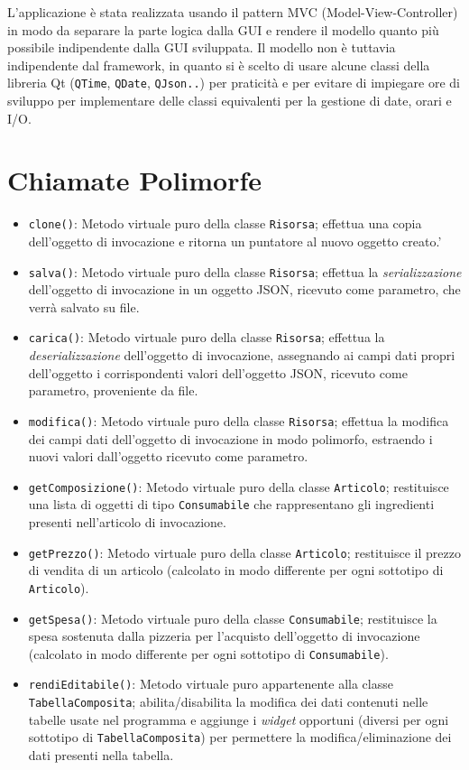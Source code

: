 \documentclass[
  10pt,
]{article}
\begin{document}
L'applicazione è stata realizzata usando il pattern MVC
(Model-View-Controller) in modo da separare la parte logica dalla GUI e
rendere il modello quanto più possibile indipendente dalla GUI
sviluppata. Il modello non è tuttavia indipendente dal framework, in
quanto si è scelto di usare alcune classi della libreria Qt
(\texttt{QTime}, \texttt{QDate}, \texttt{QJson..}) per praticità e per
evitare di impiegare ore di sviluppo per implementare delle classi
equivalenti per la gestione di date, orari e I/O.

\hypertarget{chiamate-polimorfe}{%
\section{Chiamate Polimorfe}\label{chiamate-polimorfe}}

\begin{itemize}
\item
  \texttt{clone()}: Metodo virtuale puro della classe \texttt{Risorsa};
  effettua una copia dell'oggetto di invocazione e ritorna un puntatore
  al nuovo oggetto creato.'
\item
  \texttt{salva()}: Metodo virtuale puro della classe \texttt{Risorsa};
  effettua la \emph{serializzazione} dell'oggetto di invocazione in un
  oggetto JSON, ricevuto come parametro, che verrà salvato su file.
\item
  \texttt{carica()}: Metodo virtuale puro della classe \texttt{Risorsa};
  effettua la \emph{deserializzazione} dell'oggetto di invocazione,
  assegnando ai campi dati propri dell'oggetto i corrispondenti valori
  dell'oggetto JSON, ricevuto come parametro, proveniente da file.
\item
  \texttt{modifica()}: Metodo virtuale puro della classe
  \texttt{Risorsa}; effettua la modifica dei campi dati dell'oggetto di
  invocazione in modo polimorfo, estraendo i nuovi valori dall'oggetto
  ricevuto come parametro.
\item
  \texttt{getComposizione()}: Metodo virtuale puro della classe
  \texttt{Articolo}; restituisce una lista di oggetti di tipo
  \texttt{Consumabile} che rappresentano gli ingredienti presenti
  nell'articolo di invocazione.
\item
  \texttt{getPrezzo()}: Metodo virtuale puro della classe
  \texttt{Articolo}; restituisce il prezzo di vendita di un articolo
  (calcolato in modo differente per ogni sottotipo di
  \texttt{Articolo}).
\item
  \texttt{getSpesa()}: Metodo virtuale puro della classe
  \texttt{Consumabile}; restituisce la spesa sostenuta dalla pizzeria
  per l'acquisto dell'oggetto di invocazione (calcolato in modo
  differente per ogni sottotipo di \texttt{Consumabile}).
\item
  \texttt{rendiEditabile()}: Metodo virtuale puro appartenente alla
  classe \texttt{TabellaComposita}; abilita/disabilita la modifica dei
  dati contenuti nelle tabelle usate nel programma e aggiunge i
  \emph{widget} opportuni (diversi per ogni sottotipo di
  \texttt{TabellaComposita}) per permettere la modifica/eliminazione dei
  dati presenti nella tabella.
\end{itemize}
\end{document}
